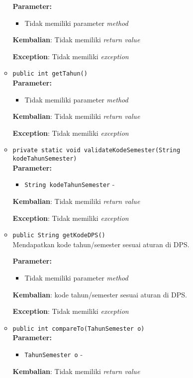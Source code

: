 \documentclass{article}
\begin{document}
\begin{enumerate}
\begin{itemize}
\textbf{Parameter:}\begin{itemize}
\item Tidak memiliki parameter \textit{method}
\end{itemize}
\textbf{Kembalian}: Tidak memiliki \textit{return value}

\textbf{Exception}: Tidak memiliki \textit{exception}

\item \texttt{public int getTahun()}\\ 


\textbf{Parameter:}\begin{itemize}
\item Tidak memiliki parameter \textit{method}
\end{itemize}
\textbf{Kembalian}: Tidak memiliki \textit{return value}

\textbf{Exception}: Tidak memiliki \textit{exception}

\item \texttt{private static void validateKodeSemester(String kodeTahunSemester)}\\ 


\textbf{Parameter:}\begin{itemize}
\item \texttt{String kodeTahunSemester} - 
\end{itemize}
\textbf{Kembalian}: Tidak memiliki \textit{return value}

\textbf{Exception}: Tidak memiliki \textit{exception}

\item \texttt{public String getKodeDPS()}\\ 
Mendapatkan kode tahun/semester sesuai aturan di DPS.

\textbf{Parameter:}\begin{itemize}
\item Tidak memiliki parameter \textit{method}
\end{itemize}
\textbf{Kembalian}: kode tahun/semester sesuai aturan di DPS.

\textbf{Exception}: Tidak memiliki \textit{exception}

\item \texttt{public int compareTo(TahunSemester o)}\\ 


\textbf{Parameter:}\begin{itemize}
\item \texttt{TahunSemester o} - 
\end{itemize}
\textbf{Kembalian}: Tidak memiliki \textit{return value}


\end{itemize}
\end{enumerate}
\end{document}
